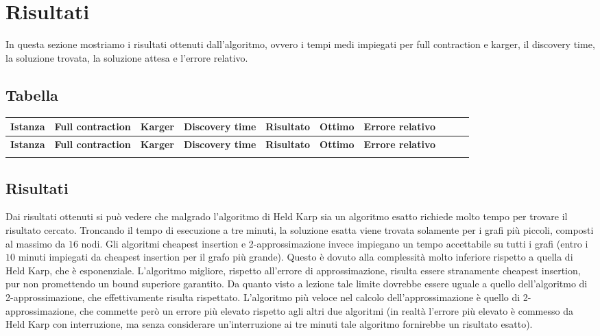\chapter{Risultati\label{sec:risultati}}
\noindent In questa sezione mostriamo i risultati ottenuti dall'algoritmo, ovvero i tempi medi impiegati per full contraction e karger, il discovery time, la soluzione trovata, la soluzione attesa e l'errore relativo.

\section{Tabella\label{sec:tabella}}

\footnotesize
\begin{tabularx}{\textwidth}{*{10}{Y}}
    \toprule
    \textbf{Istanza} & \textbf{Full contraction} & \textbf{Karger} & \textbf{Discovery time} & \textbf{Risultato} & \textbf{Ottimo} & \textbf{Errore relativo}\\
    \endfirsthead
    \toprule
    \textbf{Istanza} & \textbf{Full contraction} & \textbf{Karger} & \textbf{Discovery time} & \textbf{Risultato} & \textbf{Ottimo} & \textbf{Errore relativo}\\
    \endhead
    \midrule
    
    \bottomrule
    \caption{Risultati}\label{tab:risultati}
\end{tabularx}

\normalsize

\clearpage

\section{Risultati\label{sec:risultati}}
Dai risultati ottenuti si può vedere che malgrado l'algoritmo di Held Karp sia un algoritmo esatto richiede molto tempo per trovare il risultato cercato. Troncando il tempo di esecuzione a tre minuti, la soluzione esatta viene trovata solamente per i grafi più piccoli, composti al massimo da $16$ nodi.
Gli algoritmi cheapest insertion e 2-approssimazione invece impiegano un tempo accettabile su tutti i grafi (entro i $10$ minuti impiegati da cheapest insertion per il grafo più grande). Questo è dovuto alla complessità molto inferiore rispetto a quella di Held Karp, che è esponenziale.
L'algoritmo migliore, rispetto all'errore di approssimazione, risulta essere stranamente cheapest insertion, pur non promettendo un bound superiore garantito.
Da quanto visto a lezione tale limite dovrebbe essere uguale a quello dell'algoritmo di 2-approssimazione, che effettivamente risulta rispettato.
L'algoritmo più veloce nel calcolo dell'approssimazione è quello di 2-approssimazione, che commette però un errore più elevato rispetto agli altri due algoritmi (in realtà l'errore più elevato è commesso da Held Karp con interruzione, ma senza considerare un'interruzione ai tre minuti tale algoritmo fornirebbe un risultato esatto).
